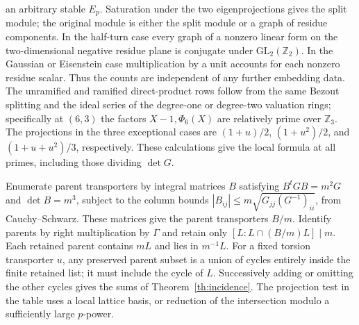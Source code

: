 an arbitrary stable $E_p$. Saturation under the two eigenprojections
gives the split module; the original module is either the split module
or a graph of residue components. In the half-turn case every graph of
a nonzero linear form on the two-dimensional negative residue plane
is conjugate under $\mathrm{GL}_2(\mathbb Z_2)$. In the Gaussian or
Eisenstein case multiplication by a unit accounts for each nonzero
residue scalar. Thus the counts are independent of any further
embedding data. The unramified and ramified direct-product rows
follow from the same Bezout splitting and the ideal series of the
degree-one or degree-two valuation rings; specifically at $(6,3)$
the factors $X-1,\Phi_6(X)$ are relatively prime over $\mathbb Z_3$.
The projections in the three exceptional cases are
$(1+u)/2$, $(1+u^2)/2$, and $(1+u+u^2)/3$, respectively. These calculations give the local formula at all primes, including
those dividing $\det G$.

Enumerate parent transporters by integral matrices $B$ satisfying
$B^tGB=m^2G$ and $\det B=m^3$, subject to the column bounds
$|B_{ij}|\le m\sqrt{G_{jj}(G^{-1})_{ii}}$, from Cauchy--Schwarz.
These matrices give the parent transporters $B/m$. Identify parents
by right multiplication by $\Gamma$ and retain only
$[L:L\cap (B/m)L]\mid m$. Each retained parent contains $mL$ and
lies in $m^{-1}L$. For a fixed torsion transporter $u$, any preserved
parent subset is a union of cycles entirely inside the finite retained
list; it must include the cycle of $L$. Successively adding or omitting
the other cycles gives the sums of Theorem~\ref{th:incidence}. The projection
test in the table uses a local lattice basis, or reduction of the
intersection modulo a sufficiently large $p$-power. 

